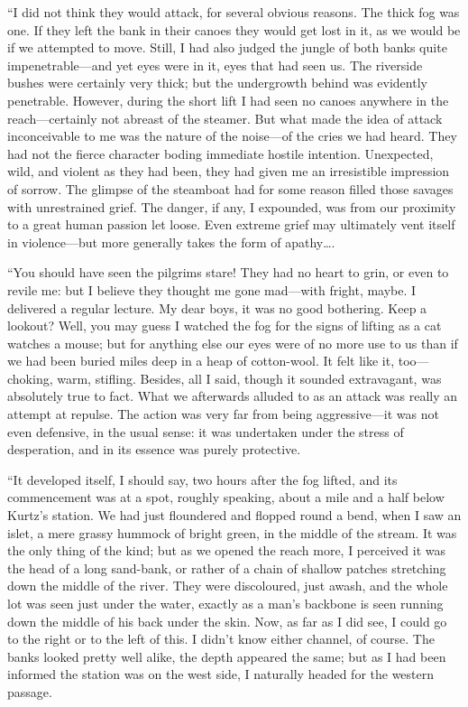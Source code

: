 \documentclass[12pt]{report}
\begin{document}
``I did not think they would attack, for several obvious reasons. The
thick fog was one. If they left the bank in their canoes they would get
lost in it, as we would be if we attempted to move. Still, I had also
judged the jungle of both banks quite impenetrable---and yet eyes were
in it, eyes that had seen us. The riverside bushes were certainly very
thick; but the undergrowth behind was evidently penetrable. However,
during the short lift I had seen no canoes anywhere in the
reach---certainly not abreast of the steamer. But what made the idea of
attack inconceivable to me was the nature of the noise---of the cries we
had heard. They had not the fierce character boding immediate hostile
intention. Unexpected, wild, and violent as they had been, they had
given me an irresistible impression of sorrow. The glimpse of the
steamboat had for some reason filled those savages with unrestrained
grief. The danger, if any, I expounded, was from our proximity to a
great human passion let loose. Even extreme grief may ultimately vent
itself in violence---but more generally takes the form of
apathy\ldots{}.

``You should have seen the pilgrims stare! They had no heart to grin, or
even to revile me: but I believe they thought me gone mad---with fright,
maybe. I delivered a regular lecture. My dear boys, it was no good
bothering. Keep a lookout? Well, you may guess I watched the fog for the
signs of lifting as a cat watches a mouse; but for anything else our
eyes were of no more use to us than if we had been buried miles deep in
a heap of cotton-wool. It felt like it, too---choking, warm, stifling.
Besides, all I said, though it sounded extravagant, was absolutely true
to fact. What we afterwards alluded to as an attack was really an
attempt at repulse. The action was very far from being aggressive---it
was not even defensive, in the usual sense: it was undertaken under the
stress of desperation, and in its essence was purely protective.

``It developed itself, I should say, two hours after the fog lifted, and
its commencement was at a spot, roughly speaking, about a mile and a
half below Kurtz's station. We had just floundered and flopped round a
bend, when I saw an islet, a mere grassy hummock of bright green, in the
middle of the stream. It was the only thing of the kind; but as we
opened the reach more, I perceived it was the head of a long sand-bank,
or rather of a chain of shallow patches stretching down the middle of
the river. They were discoloured, just awash, and the whole lot was seen
just under the water, exactly as a man's backbone is seen running down
the middle of his back under the skin. Now, as far as I did see, I could
go to the right or to the left of this. I didn't know either channel, of
course. The banks looked pretty well alike, the depth appeared the same;
but as I had been informed the station was on the west side, I naturally
headed for the western passage.
\end{document}
